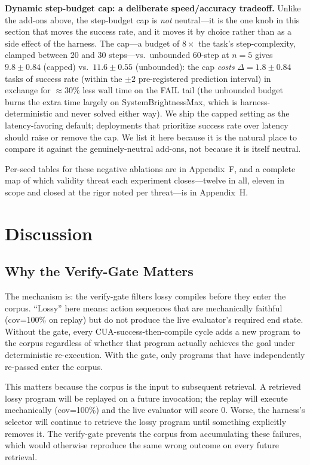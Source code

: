 \documentclass[11pt]{article}
\begin{document}
\textbf{Dynamic step-budget cap: a deliberate speed/accuracy tradeoff.} Unlike the add-ons above, the step-budget cap is \emph{not} neutral---it is the one knob in this section that moves the success rate, and it moves it by choice rather than as a side effect of the harness. The cap---a budget of $8\times$ the task's step-complexity, clamped between 20 and 30 steps---vs.\ unbounded 60-step at $n{=}5$ gives $9.8 \pm 0.84$ (capped) vs.\ $11.6 \pm 0.55$ (unbounded): the cap \emph{costs} $\Delta = 1.8 \pm 0.84$ tasks of success rate (within the $\pm 2$ pre-registered prediction interval) in exchange for $\approx 30\%$ less wall time on the FAIL tail (the unbounded budget burns the extra time largely on SystemBrightnessMax, which is harness-deterministic and never solved either way). We ship the capped setting as the latency-favoring default; deployments that prioritize success rate over latency should raise or remove the cap. We list it here because it is the natural place to compare it against the genuinely-neutral add-ons, not because it is itself neutral.

Per-seed tables for these negative ablations are in Appendix~F, and a complete map of which validity threat each experiment closes---twelve in all, eleven in scope and closed at the rigor noted per threat---is in Appendix~H.

\section{Discussion}
\label{sec:discussion}

\subsection{Why the Verify-Gate Matters}

The mechanism is: the verify-gate filters lossy compiles before they enter the corpus. ``Lossy'' here means: action sequences that are mechanically faithful (cov=100\% on replay) but do not produce the live evaluator's required end state. Without the gate, every CUA-success-then-compile cycle adds a new program to the corpus regardless of whether that program actually achieves the goal under deterministic re-execution. With the gate, only programs that have independently re-passed enter the corpus.

This matters because the corpus is the input to subsequent retrieval. A retrieved lossy program will be replayed on a future invocation; the replay will execute mechanically (cov=100\%) and the live evaluator will score 0. Worse, the harness's selector will continue to retrieve the lossy program until something explicitly removes it. The verify-gate prevents the corpus from accumulating these failures, which would otherwise reproduce the same wrong outcome on every future retrieval.
\end{document}
